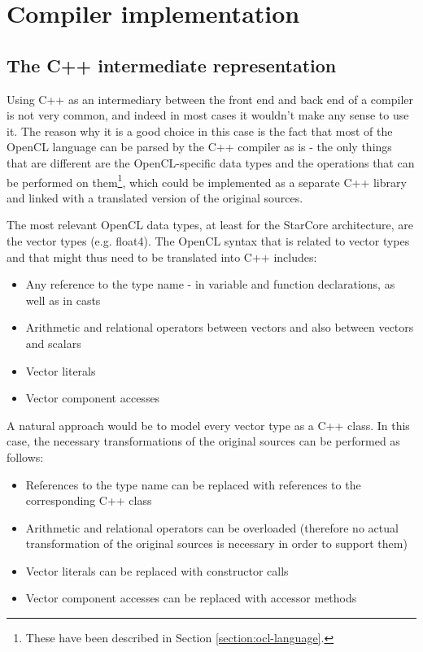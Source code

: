 \chapter{Compiler implementation}
\label{chapter:compiler}

\section{The C++ intermediate representation}
\label{section:IR}
Using C++ as an intermediary between the front end and back end of a compiler is not very common, and indeed in most cases it wouldn't make any sense to use it. The reason why it is a good choice in this case is the fact that most of the OpenCL language can be parsed by the C++ compiler as is - the only things that are different are the OpenCL-specific data types and the operations that can be performed on them\footnote{These have been described in Section \ref{section:ocl-language}.}, which could be implemented as a separate C++ library and linked with a translated version of the original sources.

The most relevant OpenCL data types, at least for the StarCore architecture, are the vector types (e.g. float4). The OpenCL syntax that is related to vector types and that might thus need to be translated into C++ includes:
\begin{itemize}
\item Any reference to the type name - in variable and function declarations, as well as in casts
\item Arithmetic and relational operators between vectors and also between vectors and scalars
\item Vector literals
\item Vector component accesses
\end{itemize}

A natural approach would be to model every vector type as a C++ class. In this case, the necessary transformations of the original sources can be performed as follows:
\begin{itemize}
\item References to the type name can be replaced with references to the corresponding C++ class
\item Arithmetic and relational operators can be overloaded (therefore no actual transformation of the original sources is necessary in order to support them)
\item Vector literals can be replaced with constructor calls
\item Vector component accesses can be replaced with accessor methods
\end{itemize}

